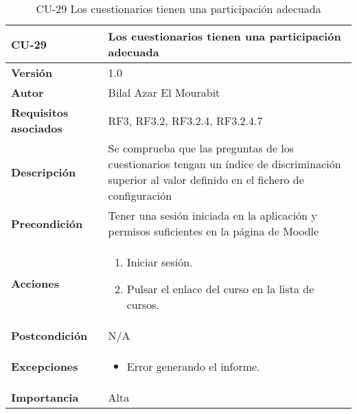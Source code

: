 \begin{table}[H]
	\centering
	\begin{tabularx}{\linewidth}{ p{} p{} }
		\toprule
		\textbf{CU-29}    & \textbf{Los cuestionarios tienen una participación adecuada}\\
		\toprule
		\textbf{Versión}              & 1.0    \\
		\textbf{Autor}                & Bilal Azar El Mourabit \\
		\textbf{Requisitos asociados} & RF3, RF3.2, RF3.2.4, RF3.2.4.7 \\
		\textbf{Descripción}          & Se comprueba que las preguntas de los cuestionarios tengan un índice de discriminación superior al valor definido en el fichero de configuración\\
    		\textbf{Precondición}         & Tener una sesión iniciada en la aplicación y permisos suficientes en la página de Moodle\\
		\textbf{Acciones}             & 
		\begin{enumerate}
			\def\labelenumi{\arabic{enumi}.}
			\tightlist
			\item Iniciar sesión.
            \item Pulsar el enlace del curso en la lista de cursos. 
		\end{enumerate}\\
		\textbf{Postcondición}        & N/A \\
		\textbf{Excepciones}          & \begin{itemize}
		    \item Error generando el informe.
		\end{itemize} \\
		\textbf{Importancia}          & Alta \\
		\bottomrule
	\end{tabularx}
	\caption{CU-29 Los cuestionarios tienen una participación
adecuada}
\end{table}

